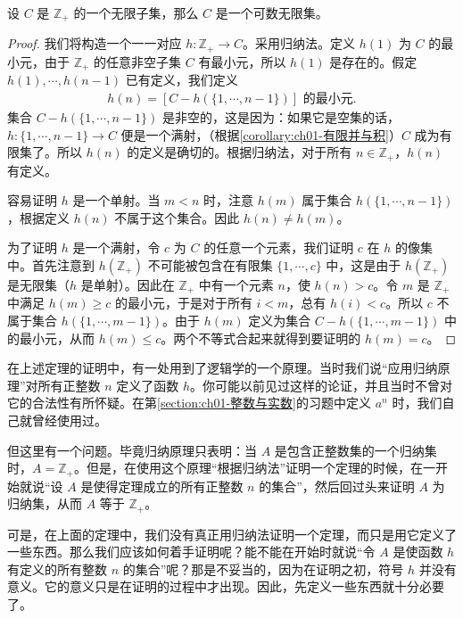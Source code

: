 \documentclass[../../main.tex]{subfiles}
\begin{document}
\begin{lemma}[正整数的无限子集可数]\label{lemma:ch01-正整数无限子集}
设 $C$ 是 $\mathbb{Z}_{+}$ 的一个无限子集，那么 $C$ 是一个可数无限集。
\end{lemma}

\begin{proof}
我们将构造一个一一对应 $h: \mathbb{Z}_{+} \longrightarrow C$。采用归纳法。定义 $h(1)$ 为 $C$ 的最小元，由于 $\mathbb{Z}_{+}$ 的任意非空子集 $C$ 有最小元，所以 $h(1)$ 是存在的。假定 $h(1), \cdots, h(n-1)$ 已有定义，我们定义
\begin{align*}
h(n) = [C - h(\{1, \cdots, n-1\})] \text{ 的最小元}.
\end{align*}
集合 $C - h(\{1, \cdots, n-1\})$ 是非空的，这是因为：如果它是空集的话，$h: \{1, \cdots, n-1\} \longrightarrow C$ 便是一个满射，（根据\cref{corollary:ch01-有限并与积}）$C$ 成为有限集了。所以 $h(n)$ 的定义是确切的。根据归纳法，对于所有 $n \in \mathbb{Z}_{+}$，$h(n)$ 有定义。

容易证明 $h$ 是一个单射。当 $m < n$ 时，注意 $h(m)$ 属于集合 $h(\{1, \cdots, n-1\})$，根据定义 $h(n)$ 不属于这个集合。因此 $h(n) \neq h(m)$。

为了证明 $h$ 是一个满射，令 $c$ 为 $C$ 的任意一个元素，我们证明 $c$ 在 $h$ 的像集中。首先注意到 $h(\mathbb{Z}_{+})$ 不可能被包含在有限集 $\{1, \cdots, c\}$ 中，这是由于 $h(\mathbb{Z}_{+})$ 是无限集（$h$ 是单射）。因此在 $\mathbb{Z}_{+}$ 中有一个元素 $n$，使 $h(n) > c$。令 $m$ 是 $\mathbb{Z}_{+}$ 中满足 $h(m) \geqslant c$ 的最小元，于是对于所有 $i < m$，总有 $h(i) < c$。所以 $c$ 不属于集合 $h(\{1, \cdots, m-1\})$。由于 $h(m)$ 定义为集合 $C - h(\{1, \cdots, m-1\})$ 中的最小元，从而 $h(m) \leqslant c$。两个不等式合起来就得到要证明的 $h(m) = c$。
\end{proof}

在上述定理的证明中，有一处用到了逻辑学的一个原理。当时我们说“应用归纳原理”对所有正整数 $n$ 定义了函数 $h$。你可能以前见过这样的论证，并且当时不曾对它的合法性有所怀疑。在第\cref{section:ch01-整数与实数}的习题中定义 $a^{n}$ 时，我们自己就曾经使用过。

但这里有一个问题。毕竟归纳原理只表明：当 $A$ 是包含正整数集的一个归纳集时，$A = \mathbb{Z}_{+}$。但是，在使用这个原理“根据归纳法”证明一个定理的时候，在一开始就说“设 $A$ 是使得定理成立的所有正整数 $n$ 的集合”，然后回过头来证明 $A$ 为归纳集，从而 $A$ 等于 $\mathbb{Z}_{+}$。

可是，在上面的定理中，我们没有真正用归纳法证明一个定理，而只是用它定义了一些东西。那么我们应该如何着手证明呢？能不能在开始时就说“令 $A$ 是使函数 $h$ 有定义的所有整数 $n$ 的集合”呢？那是不妥当的，因为在证明之初，符号 $h$ 并没有意义。它的意义只是在证明的过程中才出现。因此，先定义一些东西就十分必要了。
\end{document}
